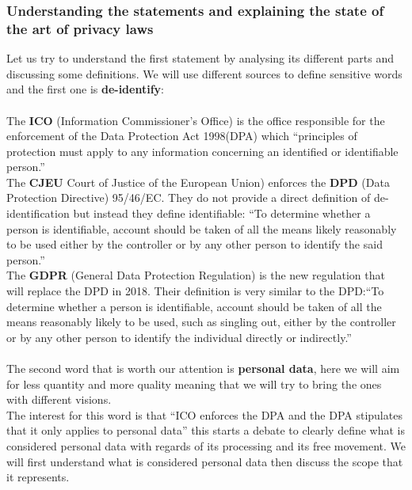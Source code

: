 \documentclass[9pt]{article}
\begin{document}
\subsubsection{Understanding the statements and explaining the state of the art of privacy laws}
Let us try to understand the first statement by analysing its different parts and discussing some definitions. We will use different sources to define sensitive words and the first one is \textbf{de-identify}:\\\\
The \textbf{ICO} (Information Commissioner's Office) is the office responsible for the enforcement of the Data Protection Act 1998(DPA) which \enquote{principles of protection must apply to any information concerning an identified or identifiable person.}\cite{ICO:PD}\\
The \textbf{CJEU} Court of Justice of the European Union) enforces the \textbf{DPD} (Data Protection Directive) 95/46/EC. They do not provide a direct definition of de-identification but instead they define identifiable: \enquote{To determine whether a person is identifiable, account should be taken of all the means likely reasonably to be used either by the controller or by any other person to identify the said person.} \cite{CJEU - DPD 1995}\\
The \textbf{GDPR} (General Data Protection Regulation) is the new regulation that will replace the DPD in 2018. Their definition is very similar to the DPD:\enquote{To determine whether a person is identifiable, account should be taken of all the means reasonably likely to be used, such as singling out, either by the controller or by any other person to identify the individual directly or indirectly.}\cite{GDPR:2016}\\\\
The second word that is worth our attention is \textbf{personal data}, here we will aim for less quantity and more quality meaning that we will try to bring the ones with different visions. \\
The interest for this word is that \enquote{ICO enforces the DPA and the DPA stipulates that it only applies to personal data} this starts a debate to clearly define what is considered personal data with regards of its processing and its free movement. We will first understand what is considered personal data then discuss the scope that it represents.\\\\
\end{document}
